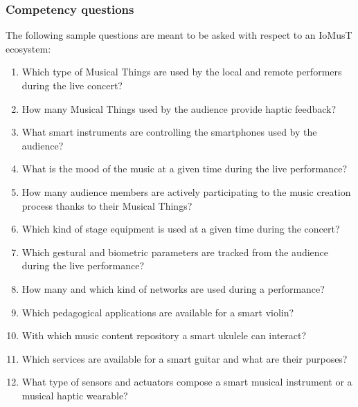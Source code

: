 \subsubsection{\textsf{Competency questions}}
The following sample questions are meant to be asked with respect to an IoMusT ecosystem:
\begin{multicols}{2}
\begin{enumerate}
\item Which type of Musical Things are used by the local and remote performers during the live concert?
\item How many Musical Things used by the audience provide haptic feedback?
\item What smart instruments are controlling the smartphones used by the audience?
\item What is the mood of the music at a given time during the live performance?
\item How many audience members are actively participating to the music creation process thanks to their Musical Things?
\item Which kind of stage equipment is used at a given time during the concert?
\item Which gestural and biometric parameters are tracked from the audience during the live performance?
\item How many and which kind of networks are used during a performance?
\item Which pedagogical applications are available for a smart violin?
\item With which music content repository a smart ukulele can interact?
\item Which services are available for a smart guitar and what are their purposes?
\item What type of sensors and actuators compose a smart musical instrument or a musical haptic wearable?
\end{enumerate}
\end{multicols}

